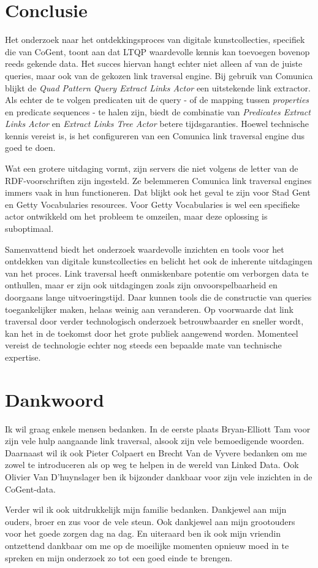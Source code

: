 \documentclass[conference]{IEEEtran}
\begin{document}
\section*{Conclusie}
Het onderzoek naar het ontdekkingsproces van digitale kunstcollecties, specifiek die van CoGent, toont aan dat LTQP waardevolle kennis kan toevoegen bovenop reeds gekende data. Het succes hiervan hangt echter niet alleen af van de juiste queries, maar ook van de gekozen link traversal engine. Bij gebruik van Comunica blijkt de \textit{Quad Pattern Query Extract Links Actor} een uitstekende link extractor. Als echter de te volgen predicaten uit de query - of de mapping tussen \textit{properties} en predicate sequences - te halen zijn, biedt de combinatie van \textit{Predicates Extract Links Actor} en \textit{Extract Links Tree Actor} betere tijdsgaranties. Hoewel technische kennis vereist is, is het configureren van een Comunica link traversal engine dus goed te doen.

Wat een grotere uitdaging vormt, zijn servers die niet volgens de letter van de RDF-voorschriften zijn ingesteld. Ze belemmeren Comunica link traversal engines immers vaak in hun functioneren. Dat blijkt ook het geval te zijn voor Stad Gent en Getty Vocabularies resources. Voor Getty Vocabularies is wel een specifieke actor ontwikkeld om het probleem te omzeilen, maar deze oplossing is suboptimaal.

Samenvattend biedt het onderzoek waardevolle inzichten en tools voor het ontdekken van digitale kunstcollecties en belicht het ook de inherente uitdagingen van het proces. Link traversal heeft onmiskenbare potentie om verborgen data te onthullen, maar er zijn ook uitdagingen zoals zijn onvoorspelbaarheid en doorgaans lange uitvoeringstijd. Daar kunnen tools die de constructie van queries toegankelijker maken, helaas weinig aan veranderen. Op voorwaarde dat link traversal door verder technologisch onderzoek betrouwbaarder en sneller wordt, kan het in de toekomst door het grote publiek aangewend worden. Momenteel vereist de technologie echter nog steeds een bepaalde mate van technische expertise.

\section*{Dankwoord}
Ik wil graag enkele mensen bedanken. In de eerste plaats Bryan-Elliott Tam voor zijn vele hulp aangaande link traversal, alsook zijn vele bemoedigende woorden. Daarnaast wil ik ook Pieter Colpaert en Brecht Van de Vyvere bedanken om me zowel te introduceren als op weg te helpen in de wereld van Linked Data. Ook Olivier Van D'huynslager ben ik bijzonder dankbaar voor zijn vele inzichten in de CoGent-data.

Verder wil ik ook uitdrukkelijk mijn familie bedanken. Dankjewel aan mijn ouders, broer en zus voor de vele steun. Ook dankjewel aan mijn grootouders voor het goede zorgen dag na dag. En uiteraard ben ik ook mijn vriendin ontzettend dankbaar om me op de moeilijke momenten opnieuw moed in te spreken en mijn onderzoek zo tot een goed einde te brengen.



\end{document}
